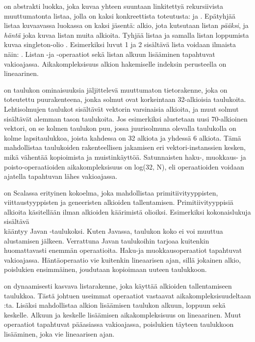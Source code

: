 on abstrakti luokka, joka kuvaa yhteen suuntaan linkitettyä rekursiivista muuttumatonta listaa, jolla on kaksi konkreettista toteutusta:  ja . Epätyhjää listaa kuvaavassa luokassa \code{::} on kaksi jäsentä: alkio, jota kutsutaan listan \textit{pääksi}, ja \textit{häntä} joka kuvaa listan muita alkioita. Tyhjää listaa ja samalla listan loppumista kuvaa singleton-olio . Esimerkiksi luvut 1 ja 2 sisältävä lista voidaan ilmaista näin: . Listan -ja -operaatiot sekä listan alkuun lisääminen tapahtuvat vakioajassa. Aikakompleksisuus alkion hakemiselle indeksin perusteella on lineaarinen.
\cite{scalaAPI}
\cite{scalaCollections}

 on taulukon ominaisuuksia jäljittelevä muuttumaton tietorakenne, joka on toteutettu puurakenteena, jonka solmut ovat korkeintaan 32-alkioisia taulukoita. Lehtisolmujen taulukot sisältävät vektorin varsinaisia alkioita, ja muut solmut sisältävät alemman tason taulukoita. Jos esimerkiksi alustetaan uusi 70-alkioinen vektori, on se kolmen taulukon puu, jossa juurisolmuna olevalla taulukolla on kolme lapsitaulukkoa, joista kahdessa on 32 alkiota ja yhdessä 6 alkiota. Tämä mahdollistaa taulukoiden rakenteellisen jakamisen eri vektori-instanssien kesken, mikä vähentää kopioimista ja muistinkäyttöä. Satunnaisten haku-, muokkaus- ja poisto-operaatioiden aikakompleksisuus on log(32, N), eli operaatioiden voidaan ajatella tapahtuvan lähes vakioajassa.
\cite{scalaCollections}
\cite[Luku 4]{highPerformanceProgramming}

 on Scalassa erityinen kokoelma, joka mahdollistaa primitiivityyppisten, viittaustyyppisten ja geneeristen alkioiden tallentamisen. Primitiivityyppisiä alkioita käsitellään ilman alkioiden käärimistä olioiksi. Esimerkiksi kokonaislukuja sisältävä \\ kääntyy Javan -taulukoksi. Kuten Javassa, taulukon koko ei voi muuttua alustamisen jälkeen. Verrattuna Javan taulukoihin  tarjoaa kuitenkin huomattavasti enemmän operaatioita. Haku-ja muokkausoperaatiot tapahtuvat vakioajassa. Häntäoperaatio vie kuitenkin lineaarisen ajan, sillä jokainen alkio, poislukien ensimmäinen, joudutaan kopioimaan uuteen taulukkoon.
\cite{scalaCollections}

 on dynaamisesti kasvava listarakenne, joka käyttää alkioiden tallentamiseen taulukkoa. Tästä johtuen useimmat operaatiot vastaavat aikakompleksisuudeltaan :ta. Lisäksi  mahdollistaa alkion lisäämisen taulukon alkuun, loppuun sekä keskelle. Alkuun ja keskelle lisäämisen aikakompleksisuus on lineaarinen. Muut operaatiot tapahtuvat pääasiassa vakioajassa, poislukien täyteen taulukkoon lisääminen, joka vie lineaarisen ajan.
\cite{scalaCollections}

